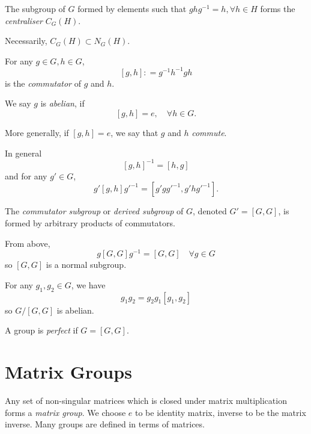 \documentclass[a4paper,11pt]{article}
\begin{document}
	\begin{defi}
		The subgroup of $G$ formed by elements such that $g h g^{-1} = h, \forall h \in H$ forms the \emph{centraliser} $C_G(H)$.
	\end{defi}

	\begin{cor}
		Necessarily, $C_G(H) \subset N_G(H)$.
	\end{cor}

	\begin{defi}
		For any $g \in G, h \in G$, 
		\[
			[g,h] : = g^{-1} h^{-1} g h
		\]
		is the \emph{commutator} of $g$ and $h$. 
		
		We say $g$ is \emph{abelian}, if
		\[
			[g,h] = e, \quad \forall h\in G.
		\]

		More generally, if $[g,h] = e$, we say that $g$ and $h$ \emph{commute}.
	\end{defi}

	\begin{cor}
		In general
		\[
			[g,h]^{-1} = [h,g]
		\]
		and for any $g' \in G$,
		\[
			g' [g,h] g'^{-1} = [g' g g'^{-1}, g' h g'^{-1}].
		\]
	\end{cor}

	\begin{defi}
		The \emph{commutator subgroup} or \emph{derived subgroup} of $G$, denoted $G' = [G,G]$, is formed by arbitrary products of commutators.
	\end{defi}

	\begin{cor}
		From above,
		\[
			g[G,G]g^{-1} = [G,G] \quad \forall g \in G
		\]
		so $[G,G]$ is a normal subgroup.
	\end{cor}

	\begin{cor}
		For any $g_1, g_2 \in G$, we have
		\[
			g_1 g_2 = g_2 g_1 [g_1, g_2]
		\]
		so $G/ [G,G]$ is abelian.
	\end{cor}

	\begin{defi}
		A group is \emph{perfect} if $G = [G,G]$.
	\end{defi}

	\newpage

	\section{Matrix Groups}

	Any set of non-singular matrices which is closed under matrix multiplication forms a \emph{matrix group}. We choose $e$ to be identity matrix, inverse to be the matrix inverse. Many groups are defined in terms of matrices.
\end{document}
